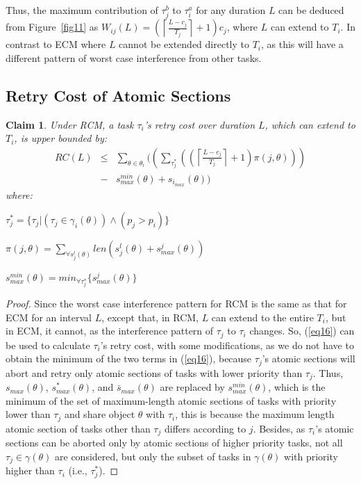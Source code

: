 \documentclass{sig-alternate}
\newtheorem{clm}{Claim}
\begin{document}
Thus, the maximum contribution of $\tau_{j}^b$ to $\tau_{i}^a$ for any duration
$L$ can be deduced from Figure~\ref{fig11} as $W_{ij}(L)=\left(\left\lceil\frac{L-c_{j}}{T_{j}}\right\rceil+1 \right)c_{j}$,
where $L$ can extend to $T_{i}$. In contrast to ECM where $L$ cannot be extended directly to $T_i$, as this will have a different pattern of worst case interference from other tasks.

\subsection{Retry Cost of Atomic Sections}

\begin{clm}
Under RCM, a task $\tau_i$'s retry cost over duration $L$, which can extend to $T_i$, is upper bounded by:
\begin{eqnarray}
RC\left(L\right) & \le & \sum_{\theta\in\theta_{i}}\Bigg(\left(\sum_{\tau_{j}^{*}}\left(\left(\left\lceil\frac{L-c_{j}}{T_{j}}\right\rceil+1\right)\pi\left(j,\theta\right)\right)\right)\nonumber \\
 & - & s_{max}^{min}\left(\theta\right)+s_{i_{max}}\left(\theta\right)\Bigg)\label{eq20}\end{eqnarray}
 where:
 \begin{compactitem}
\item $\tau_{j}^{*}=\{\tau_{j}|(\tau_{j}\in\gamma_i(\theta))\wedge(p_{j}> p_{i})\}$
\item $\pi(j,\theta)=\sum_{\forall s_{j}^{l}(\theta)}len\left(s_{j}^{l}\left(\theta\right)+s_{max}^{j}\left(\theta\right)\right)$
\item $s_{max}^{min}(\theta)=min_{\forall \tau_j^*} \{s_{max}^j(\theta)\}$
\end{compactitem}
\end{clm}
\begin{proof}
Since the worst case interference pattern for RCM is the same as that for ECM for an interval $L$, except that, in RCM, $L$ can extend to the entire $T_i$, but in ECM, it cannot, as the interference pattern of $\tau_j$ to $\tau_i$ changes. 
So, (\ref{eq16}) can be used to calculate $\tau_i$'s retry cost, with some modifications, as we do not have to obtain the minimum of the two terms in (\ref{eq16}), because $\tau_j$'s atomic sections will abort and retry only atomic sections of tasks with lower priority than $\tau_j$. Thus, $s_{max}(\theta)$, $s_{max}^*(\theta)$, and $\bar{s}_{max}(\theta)$ are replaced by $s_{max}^{min}(\theta)$, which is the minimum of the set of maximum-length atomic sections of tasks with priority lower than $\tau_j$ and share object $\theta$ with $\tau_i$, this is because the maximum length atomic section of tasks other than $\tau_j$ differs according to $j$. Besides, as $\tau_i$'s atomic sections can be aborted only by atomic sections of higher priority tasks, not all $\tau_j \in \gamma (\theta)$ are considered, but only the subset of tasks in $\gamma (\theta)$ with priority higher than $\tau_i$ (i.e., $\tau_j^*$). 
\end{proof}
\end{document}
